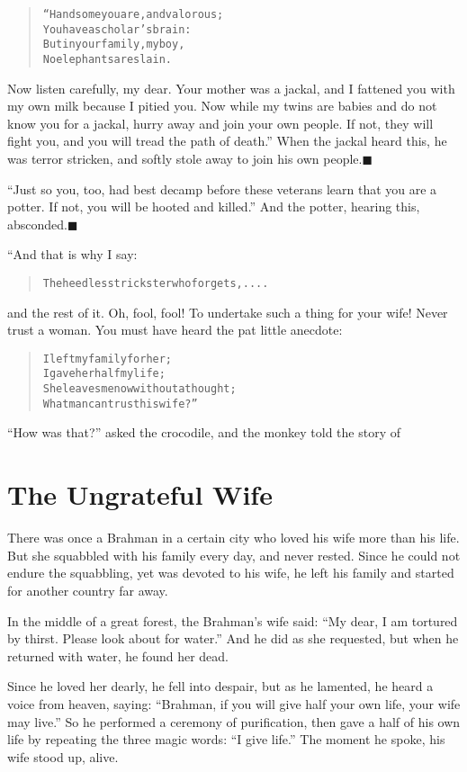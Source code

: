 \documentclass[article, twoside, 14pt]{memoir}
\newcommand{\qed}{\hfill \ensuremath{\blacksquare}}
\renewenvironment{verbatim}{%
\begin{quote}%
\vskip -10pt%
\begin{alltt}\normalfont\large}{\end{alltt}%
\end{quote}%
\vskip -10pt
} %
\begin{document}
\begin{verbatim}
“Handsome you are, and valorous;
    You have a scholar's brain:
But in your family, my boy,
    No elephants are slain.
\end{verbatim}
Now listen carefully, my dear. Your mother was a jackal, and I
fattened you with my own milk because I pitied you. Now while my
twins are babies and do not know you for a jackal, hurry away and
join your own people. If not, they will fight you, and you will
tread the path of death.” When the jackal heard this, he was terror
stricken, and softly stole away to join his own
people.\hyperref[s70]{\qed}

``Just so you, too, had best decamp before these veterans learn that you are a potter. If not, you will be hooted and killed.''
And the potter, hearing this, absconded.\hyperref[s69]{\qed}

“And that is why I say:

\begin{verbatim}
The heedless trickster who forgets, ....
\end{verbatim}
and the rest of it. Oh, fool, fool! To undertake such a thing for
your wife! Never trust a woman. You must have heard the pat little
anecdote:

\begin{verbatim}
I left my family for her;
    I gave her half my life;
She leaves me now without a thought;
    What man can trust his wife?”
\end{verbatim}
``How was that?'' asked the crocodile, and the monkey told the
story of

\chapter{The Ungrateful Wife}

\label{s71}

There was once a Brahman in a certain city who loved his wife
more than his life. But she squabbled with his family every day,
and never rested. Since he could not endure the squabbling, yet was
devoted to his wife, he left his family and started for another
country far away.

In the middle of a great forest, the Brahman's wife said:
``My dear, I am tortured by thirst. Please look about for water.''
And he did as she requested, but when he returned with water, he
found her dead.

Since he loved her dearly, he fell into despair, but as he
lamented, he heard a voice from heaven, saying:
``Brahman, if you will give half your own life, your wife may live.''
So he performed a ceremony of purification, then gave a half of his
own life by repeating the three magic words: ``I give life.'' The
moment he spoke, his wife stood up, alive.
\end{document}
